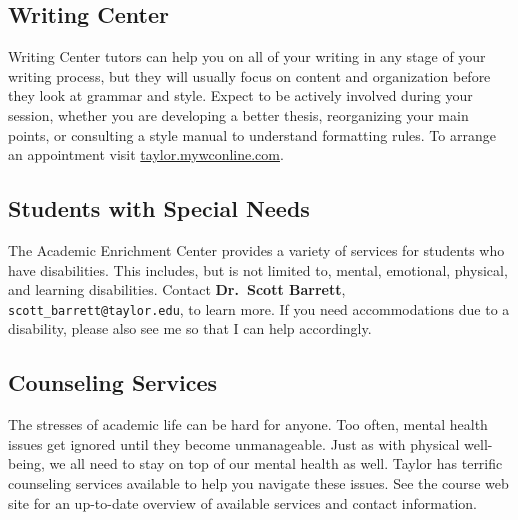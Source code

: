 \subsection{Writing Center}

Writing Center tutors can help you on all of your writing
in any stage of your writing process,
but they will usually focus on content and organization
before they look at grammar and style.
Expect to be actively involved during your session,
whether you are developing a better thesis,
reorganizing your main points,
or consulting a style manual to understand formatting rules.
To arrange an appointment visit \url{taylor.mywconline.com}.

\subsection{Students with Special Needs}

The Academic Enrichment Center provides a variety of services
for students who have disabilities.
This includes, but is not limited to, mental, emotional, physical, and learning disabilities.
Contact \textbf{Dr.\ Scott Barrett}, \texttt{scott\_barrett@taylor.edu}, to learn more.
If you need accommodations due to a disability,
please also see me so that I can help accordingly.

\subsection{Counseling Services}

The stresses of academic life can be hard for anyone.
Too often, mental health issues get ignored until they become unmanageable.
Just as with physical well-being,
we all need to 
stay on top of our mental health as well.
Taylor has terrific counseling services available
to help you navigate these issues.
See the course web site for an up-to-date overview of available
services
and contact information.



